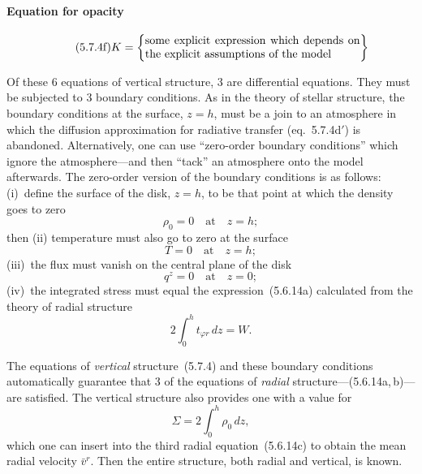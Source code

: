 \paragraph{Equation for opacity}
%
\begin{equation}
\tag{5.7.4f}
K
= \left\{
    \begin{minipage}{0.55\columnwidth}
    some explicit expression which depends on
    the explicit assumptions of the model
    \end{minipage}
  \right\}
\end{equation}

Of these 6 equations of vertical structure, 3 are differential equations.  They
must be subjected to 3 boundary conditions.  As in the theory of stellar structure,
the boundary conditions at the surface, $z = h$, must be a join to an atmosphere in
which the diffusion approximation for radiative transfer (eq.~5.7.4d$'$) is abandoned.
Alternatively, one can use ``zero-order boundary conditions'' which ignore the
atmosphere---and then ``tack'' an atmosphere onto the model afterwards.  The
zero-order version of the boundary conditions is as follows: (i)~define the surface
of the disk, $z = h$, to be that point at which the density goes to zero
%
\begin{equation}
\tag{5.7.5a}
\rho_0 = 0 \quad \text{at} \quad z = h;
\end{equation}
%
then (ii) temperature must also go to zero at the surface
%
\begin{equation}
\tag{5.7.5b}
T = 0 \quad \text{at} \quad z = h;
\end{equation}
%
(iii)~the flux must vanish on the central plane of the disk
%
\begin{equation}
\tag{5.7.5c}
q^z = 0 \quad \text{at} \quad z = 0;
\end{equation}
%
(iv)~the integrated stress must equal the expression~(5.6.14a) calculated from the
theory of radial structure
%
\begin{equation}
\tag{5.7.5d}
2\int_0^h t_{\varphi r}\,dz = W.
\end{equation}

The equations of \textit{vertical} structure~(5.7.4) and these boundary conditions
automatically guarantee that 3 of the equations of \textit{radial} structure---(5.6.14a,\,b)---
are satisfied.  The vertical structure also provides one with a value for
%
\begin{equation}
\Sigma = 2\int_0^h \rho_0\,dz,
\end{equation}
%
which one can insert into the third radial equation~(5.6.14c) to obtain the mean
radial velocity $\bar{v}^r$.  Then the entire structure, both radial and vertical, is known.


